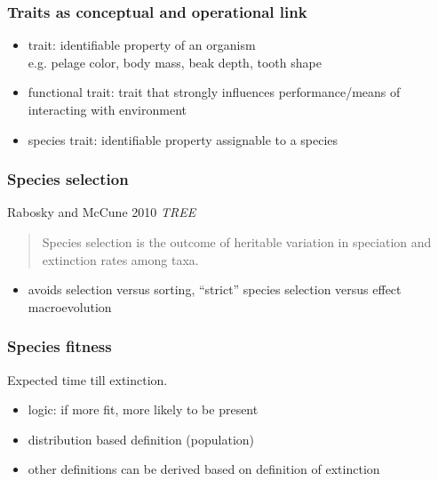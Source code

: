 \documentclass{beamer}
\begin{document}
\begin{frame}
  \frametitle{Traits as conceptual and operational link}

  \begin{definition}
    \begin{itemize}
      \item \alert{trait}: identifiable property of an organism \\e.g. pelage color, body mass, beak depth, tooth shape
      \item \alert{functional trait}: trait that strongly influences performance/means of interacting with environment
      \item \alert{species trait}: identifiable property assignable to a species
    \end{itemize}
  \end{definition}
\end{frame}

\begin{frame}
  \frametitle{Species selection}

  \begin{block}{Rabosky and McCune 2010 \em{TREE}}
    \begin{quote}
      Species selection is the outcome of heritable variation in speciation and extinction rates among taxa.
    \end{quote}
  \end{block}

  \begin{itemize}
    \item avoids selection versus sorting, ``strict'' species selection versus effect macroevolution
  \end{itemize}
\end{frame}

\begin{frame}
  \frametitle{Species fitness}

  \begin{definition}
    Expected time till extinction.
  \end{definition}

  \footnotesize{} 

  \begin{itemize}
    \item \alert{logic:} if more fit, more likely to be present
    \item distribution based definition (population)
    \item other definitions can be derived based on definition of extinction
  \end{itemize}

\end{frame}
\end{document}

